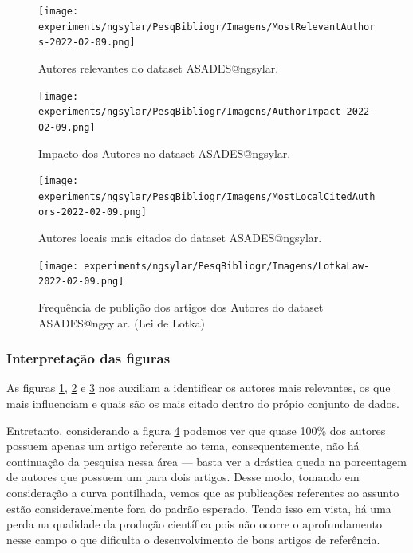 \begin{figure}[H]
    \centering
    \texttt{[image: experiments/ngsylar/PesqBibliogr/Imagens/MostRelevantAuthors-2022-02-09.png]}
    \caption{Autores relevantes do dataset ASADES@ngsylar.}
    \label{fig:ASADES@ngsylar:RelevantAuthors}
\end{figure}

\begin{figure}[H]
    \centering
    \texttt{[image: experiments/ngsylar/PesqBibliogr/Imagens/AuthorImpact-2022-02-09.png]}
    \caption{Impacto dos Autores no dataset ASADES@ngsylar.}
    \label{fig:ASADES@ngsylar:AuthorsImpact}
\end{figure}

\begin{figure}[H]
    \centering
\texttt{[image: experiments/ngsylar/PesqBibliogr/Imagens/MostLocalCitedAuthors-2022-02-09.png]}
    \caption{Autores locais mais citados do dataset ASADES@ngsylar.}
    \label{fig:ASADES@ngsylar:MostCitedAuthors}
\end{figure}

\begin{figure}[H]
    \centering
    \texttt{[image: experiments/ngsylar/PesqBibliogr/Imagens/LotkaLaw-2022-02-09.png]}
    \caption{Frequência de publição dos artigos dos Autores do dataset ASADES@ngsylar. (Lei de Lotka)}
    \label{fig:ASADES@ngsylar:Lotka}
\end{figure}

\subsubsection{Interpretação das figuras }
As figuras \ref{fig:ASADES@ngsylar:RelevantAuthors}, \ref{fig:ASADES@ngsylar:AuthorsImpact} e \ref{fig:ASADES@ngsylar:MostCitedAuthors} nos auxiliam a identificar os autores mais relevantes, os que mais influenciam e quais são os mais citado dentro do própio conjunto de dados.

Entretanto, considerando a figura \ref{fig:ASADES@ngsylar:Lotka} podemos ver que quase 100\% dos autores possuem apenas um artigo referente ao tema, consequentemente, não há continuação da pesquisa nessa área --- basta ver a drástica queda na porcentagem de autores que possuem um para dois artigos. Desse modo, tomando em consideração a curva pontilhada, vemos que as publicações referentes ao assunto estão consideravelmente fora do padrão esperado. Tendo isso em vista, há uma perda na qualidade da produção científica pois não ocorre o aprofundamento nesse campo o que dificulta o desenvolvimento de bons artigos de referência.



